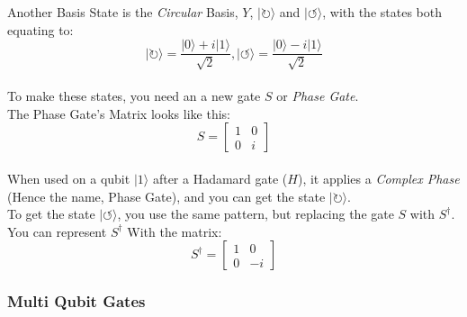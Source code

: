 \documentclass{report}
\begin{document}
Another Basis State is the \emph{Circular} Basis, $Y$,
$\lvert\circlearrowright\rangle$ and $\lvert\circlearrowleft\rangle$, with the
states both equating to:\\
\[
\lvert\circlearrowright\rangle = \frac{\lvert0\rangle +i\lvert1\rangle}{\sqrt{2}}, \lvert\circlearrowleft\rangle = \frac{\lvert0\rangle -i\lvert1\rangle}{\sqrt{2}}\]\\
To make these states, you need an a new gate \(S\) or \emph{Phase
Gate}.\\
The Phase Gate's Matrix looks like this:\\
\[
S = \left[ \begin{matrix} 1 & 0\\0 & i\end{matrix} \right]\]\\
When used on a qubit $\lvert1\rangle$ after a Hadamard gate (\(H\)), it
applies a \emph{Complex Phase} (Hence the name, Phase Gate), and you can
get the state \(\lvert\circlearrowright\rangle\).\\
To get the state \(\lvert\circlearrowleft\rangle\), you use the same pattern,
but replacing the gate \(S\) with \(S^\dagger\).\\
You can represent \(S^\dagger\) With the matrix:\\
\[
S^\dagger = \left[ \begin{matrix} 1 & 0\\0 & -i\end{matrix} \right]\]

\subsubsection{Multi Qubit Gates}
\end{document}
